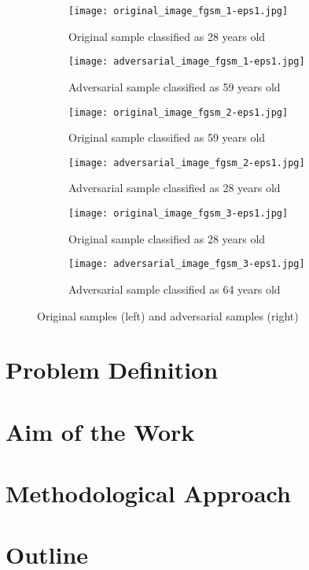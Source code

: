 \begin{figure}

\begin{subfigure}{.5\textwidth}
  \centering
  \texttt{[image: original\_image\_fgsm\_1-eps1.jpg]}
  \caption{Original sample classified as 28 years old}
\end{subfigure}
\begin{subfigure}{.5\textwidth}
  \centering
  \texttt{[image: adversarial\_image\_fgsm\_1-eps1.jpg]}
  \caption{Adversarial sample classified as 59 years old}
\end{subfigure}

\begin{subfigure}{.5\textwidth}
  \centering
  \texttt{[image: original\_image\_fgsm\_2-eps1.jpg]}
  \caption{Original sample classified as 59 years old}
\end{subfigure}
\begin{subfigure}{.5\textwidth}
  \centering
  \texttt{[image: adversarial\_image\_fgsm\_2-eps1.jpg]}
  \caption{Adversarial sample classified as 28 years old}
\end{subfigure}

\begin{subfigure}{.5\textwidth}
  \centering
  \texttt{[image: original\_image\_fgsm\_3-eps1.jpg]}
  \caption{Original sample classified as 28 years old}
\end{subfigure}
\begin{subfigure}{.5\textwidth}
  \centering
  \texttt{[image: adversarial\_image\_fgsm\_3-eps1.jpg]}
  \caption{Adversarial sample classified as 64 years old}
\end{subfigure}

\caption{Original samples (left) and adversarial samples (right)}
\label{fig:motivational-samples}
\end{figure}

\section{Problem Definition} 
\label{motivation}


\section{Aim of the Work}


\section{Methodological Approach} \label{approach}


\section{Outline} 


